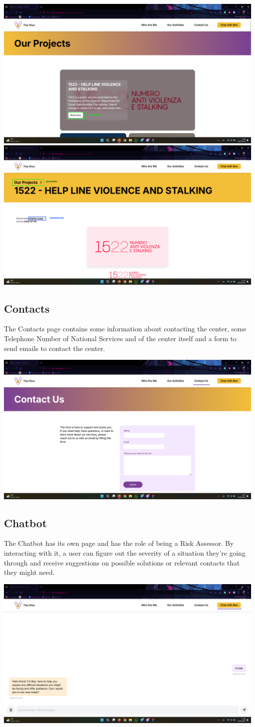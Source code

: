 \vspace{1em}
\includegraphics[width=0.5\linewidth]{img/design-document/website-screenshots/projectspage.png}
\includegraphics[width=0.5\linewidth]{img/design-document/website-screenshots/projectpage-1.png}

\subsection{Contacts}
The Contacts page contains some information about contacting the center, some Telephone Number of National Services and of the center itself and a 
form to send emails to contact the center.
\vspace{1em}
\begin{center}
    \includegraphics[width=0.5\linewidth]{img/design-document/website-screenshots/contacts.png}
\end{center}

\subsection{Chatbot}
The Chatbot has its own page and has the role of being a Risk Assessor. By interacting with it, a user can figure out the severity
of a situation they're going through and receive suggestions on possible solutions or relevant contacts that they might need.
\vspace{1em}
\begin{center}
    \includegraphics[width=0.5\linewidth]{img/design-document/website-screenshots/chatbot.png}
\end{center}


